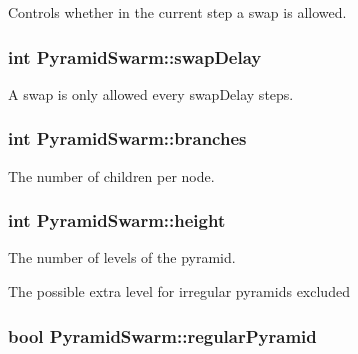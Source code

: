 Controls whether in the current step a swap is allowed. 

\hypertarget{classPyramidSwarm_b45f85f201faea37d41695fe4d3cae04}{
\subsubsection{\setlength{\rightskip}{0pt plus 5cm}int {\bf PyramidSwarm::swapDelay}}}
\label{classPyramidSwarm_b45f85f201faea37d41695fe4d3cae04}


A swap is only allowed every swapDelay steps. 

\hypertarget{classPyramidSwarm_b60c66cd8c7437c9b9abb2016a65e824}{
\subsubsection{\setlength{\rightskip}{0pt plus 5cm}int {\bf PyramidSwarm::branches}}}
\label{classPyramidSwarm_b60c66cd8c7437c9b9abb2016a65e824}


The number of children per node. 

\hypertarget{classPyramidSwarm_147496f1f506ee3f2e82cadc9c235baf}{
\subsubsection{\setlength{\rightskip}{0pt plus 5cm}int {\bf PyramidSwarm::height}}}
\label{classPyramidSwarm_147496f1f506ee3f2e82cadc9c235baf}


The number of levels of the pyramid. 

The possible extra level for irregular pyramids excluded \hypertarget{classPyramidSwarm_5e4c75c3e9a876d96c6a0ae4b32492d5}{
\subsubsection{\setlength{\rightskip}{0pt plus 5cm}bool {\bf PyramidSwarm::regularPyramid}}}
\label{classPyramidSwarm_5e4c75c3e9a876d96c6a0ae4b32492d5}


